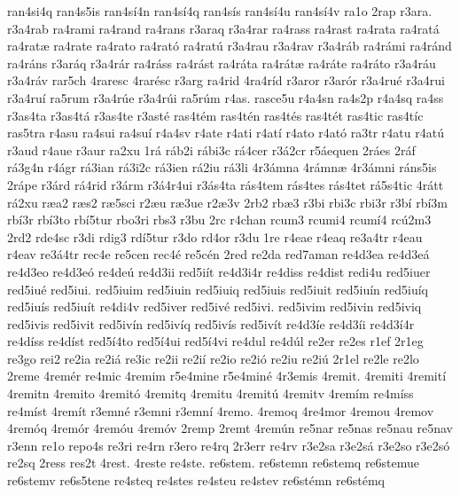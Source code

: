 {ran4si4q
ran4s5is
ran4s^^ed4n
ran4s^^ed4q
ran4s^^eds
ran4s^^ed4u
ran4s^^ed4v
ra1o
2rap
r3ara.
r3a4rab
ra4rami
ra4rand
ra4rans
r3araq
r3a4rar
ra4rass
ra4rast
ra4rata
ra4rat^^e1
ra4rat^^e6
ra4rate
ra4rato
ra4rat^^f3
ra4rat^^fa
r3a4rau
r3a4rav
r3a4r^^e1b
ra4r^^e1mi
ra4r^^e1nd
ra4r^^e1ns
r3ar^^e1q
r3a4r^^e1r
ra4r^^e1ss
ra4r^^e1st
ra4r^^e1ta
ra4r^^e1t^^e6
ra4r^^e1te
ra4r^^e1to
r3a4r^^e1u
r3a4r^^e1v
rar5ch
4raresc
4rar^^e9sc
r3arg
ra4rid
4ra4r^^edd
r3aror
r3ar^^f3r
r3a4ru^^e9
r3a4rui
r3a4ru^^ed
ra5rum
r3a4r^^fae
r3a4r^^fai
ra5r^^fam
r4as.
rasce5u
r4a4sn
ra4s2p
r4a4sq
ra4ss
r3as4ta
r3as4t^^e1
r3as4te
r3ast^^e9
ras4t^^e9m
ras4t^^e9n
ras4t^^e9s
ras4t^^e9t
ras4tic
ras4t^^edc
ras5tra
r4asu
ra4sui
ra4su^^ed
r4a4sv
r4ate
r4ati
r4at^^ed
r4ato
r4at^^f3
ra3tr
r4atu
r4at^^fa
r3aud
r4aue
r3aur
ra2xu
1r^^e1
r^^e1b2i
r^^e1bi3c
r^^e14cer
r3^^e12cr
r5^^e1equen
2r^^e1es
2r^^e1f
r^^e13g4n
r4^^e1gr
r^^e13ian
r^^e13i2c
r^^e13ien
r^^e12iu
r^^e13li
4r3^^e1mna
4r^^e1mn^^e6
4r3^^e1mni
r^^e1ns5is
2r^^e1pe
r3^^e1rd
r^^e14rid
r3^^e1rm
r3^^e14r4ui
r3^^e1s4ta
r^^e1s4tem
r^^e1s4tes
r^^e1s4tet
r^^e15s4tic
4r^^e1tt
r^^e12xu
r^^e6a2
r^^e6s2
r^^e65sci
r2^^e6u
r^^e63ue
r2^^e63v
2rb2
rb^^e63
r3bi
rbi3c
rbi3r
r3b^^ed
rb^^ed3m
rb^^ed3r
rb^^ed3to
rb^^ed5tur
rbo3ri
rbs3
r3bu
2rc
r4chan
rcum3
rcumi4
rcum^^ed4
rc^^fa2m3
2rd2
rde4sc
r3di
rdig3
rd^^ed5tur
r3do
rd4or
r3du
1re
r4eae
r4eaq
re3a4tr
r4eau
r4eav
re3^^e14tr
rec4e
re5cen
rec4^^e9
re5c^^e9n
2red
re2da
red7aman
re4d3ea
re4d3e^^e1
re4d3eo
re4d3e^^f3
re4de^^fa
re4d3ii
red5i^^edt
re4d3i4r
re4diss
re4dist
redi4u
red5iuer
red5iu^^e9
red5iui.
red5iuim
red5iuin
red5iuiq
red5iuis
red5iuit
red5iu^^edn
red5iu^^edq
red5iu^^eds
red5iu^^edt
re4di4v
red5iver
red5iv^^e9
red5ivi.
red5ivim
red5ivin
red5iviq
red5ivis
red5ivit
red5iv^^edn
red5iv^^edq
red5iv^^eds
red5iv^^edt
re4d3^^ede
re4d3^^edi
re4d3^^ed4r
re4d^^edss
re4d^^edst
red5^^ed4to
red5^^ed4ui
red5^^ed4vi
re4dul
re4d^^fal
re2er
re2es
r1ef
2r1eg
re3go
rei2
re2ia
re2i^^e1
re3ic
re2ii
re2i^^ed
re2io
re2i^^f3
re2iu
re2i^^fa
2r1el
re2le
re2lo
2reme
4rem^^e9r
re4mic
4remim
r5e4mine
r5e4min^^e9
4r3emis
4remit.
4remiti
4remit^^ed
4remitn
4remito
4remit^^f3
4remitq
4remitu
4remit^^fa
4remitv
4rem^^edm
re4m^^edss
re4m^^edst
4rem^^edt
r3emn^^e9
r3emni
r3emn^^ed
4remo.
4remoq
4re4mor
4remou
4remov
4rem^^f3q
4rem^^f3r
4rem^^f3u
4rem^^f3v
2remp
2remt
4rem^^fan
re5nar
re5nas
re5nau
re5nav
r3enn
re1o
repo4s
re3ri
re4rn
r3ero
re4rq
2r3err
re4rv
r3e2sa
r3e2s^^e1
r3e2so
r3e2s^^f3
re2sq
2ress
res2t
4rest.
4reste
re4ste.
re6stem.
re6stemn
re6stemq
re6stemue
re6stemv
re6s5tene
re4steq
re4stes
re4steu
re4stev
re6st^^e9mn
re6st^^e9mq
}
